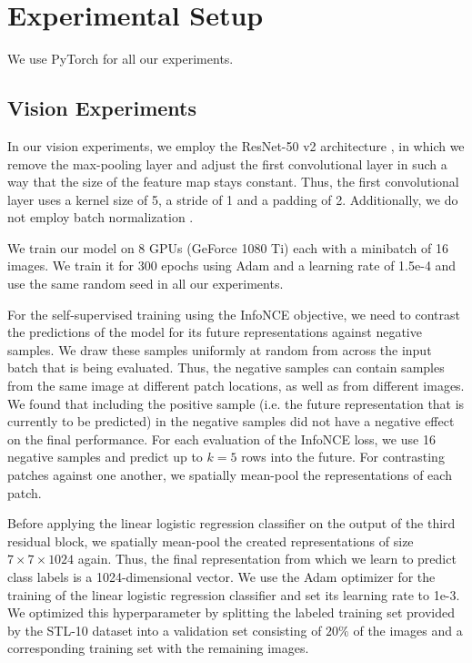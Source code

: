 \documentclass{article}
\begin{document}



\newpage
\appendix
\section{Experimental Setup}

We use PyTorch \citep{paszke2017automatic} for all our experiments.


\subsection{Vision Experiments}
\label{app:vision}
In our vision experiments, we employ the ResNet-50 v2 architecture \citep{he2016identity}, in which we remove the max-pooling layer and adjust the first convolutional layer in such a way that the size of the feature map stays constant. Thus, the first convolutional layer uses a kernel size of 5, a stride of 1 and a padding of 2. Additionally, we do not employ batch normalization \citep{ioffe2015batch}.

We train our model on 8 GPUs (GeForce 1080 Ti) each with a minibatch of 16 images. We train it for 300 epochs using Adam \citep{kingma2014adam} and a learning rate of 1.5e-4 and use the same random seed in all our experiments.

For the self-supervised training using the InfoNCE objective, we need to contrast the predictions of the model for its future representations against negative samples. We draw these samples uniformly at random from across the input batch that is being evaluated. Thus, the negative samples can contain samples from the same image at different patch locations, as well as from different images. We found that including the positive sample (i.e. the future representation that is currently to be predicted) in the negative samples did not have a negative effect on the final performance. For each evaluation of the InfoNCE loss, we use 16 negative samples and predict up to $k=5$ rows into the future. For contrasting patches against one another, we spatially mean-pool the representations of each patch.

Before applying the linear logistic regression classifier on the output of the third residual block, we spatially mean-pool the created representations of size $7 \times 7 \times 1024$ again. Thus, the final representation from which we learn to predict class labels is a 1024-dimensional vector. We use the Adam optimizer for the training of the linear logistic regression classifier and set its learning rate to 1e-3. We optimized this hyperparameter by splitting the labeled training set provided by the STL-10 dataset into a validation set consisting of $20\%$ of the images and a corresponding training set with the remaining images.
\end{document}
